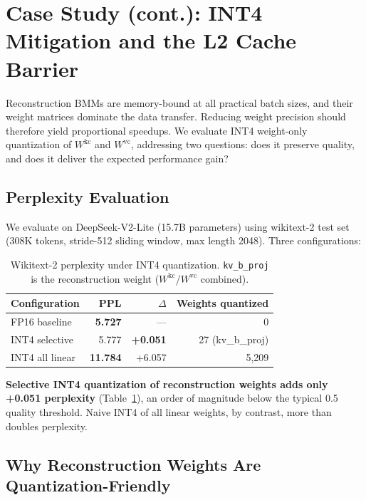 \documentclass[10pt,twocolumn]{article}
\begin{document}
\section{Case Study (cont.): INT4 Mitigation and the L2 Cache Barrier}
\label{sec:int4}

Reconstruction BMMs are memory-bound at all practical batch sizes, and their weight matrices dominate the data transfer.  Reducing weight precision should therefore yield proportional speedups.  We evaluate INT4 weight-only quantization of $W^\text{kc}$ and $W^\text{vc}$, addressing two questions: does it preserve quality, and does it deliver the expected performance gain?

\subsection{Perplexity Evaluation}

We evaluate on DeepSeek-V2-Lite (15.7B parameters) using wikitext-2 test set (308K tokens, stride-512 sliding window, max length 2048).  Three configurations:

\begin{table}[h]
\centering
\small
\caption{Wikitext-2 perplexity under INT4 quantization.  \texttt{kv\_b\_proj} is the reconstruction weight ($W^\text{kc}$/$W^\text{vc}$ combined).}
\label{tab:ppl}
\begin{tabular}{@{}lrrr@{}}
\toprule
Configuration & PPL & $\Delta$ & Weights quantized \\
\midrule
FP16 baseline       & \textbf{5.727} & ---    & 0 \\
INT4 selective       & 5.777 & \textbf{+0.051} & 27 (kv\_b\_proj) \\
INT4 all linear      & \textbf{11.784} & +6.057 & 5,209 \\
\bottomrule
\end{tabular}
\end{table}

\textbf{Selective INT4 quantization of reconstruction weights adds only +0.051 perplexity} (Table~\ref{tab:ppl}), an order of magnitude below the typical 0.5 quality threshold.  Naive INT4 of all linear weights, by contrast, more than doubles perplexity.

\subsection{Why Reconstruction Weights Are Quantization-Friendly}
\end{document}
